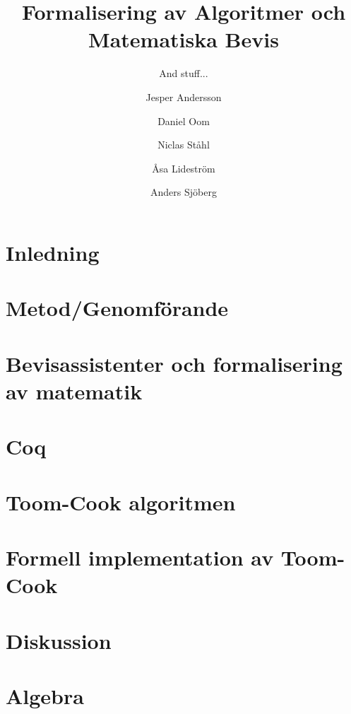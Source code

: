 \documentclass[bachelors,a4paper,gu]{chalmers-thesis}
\title{Formalisering av Algoritmer och Matematiska Bevis}
\subtitle{And stuff...}
\author{Jesper Andersson\and Daniel Oom\and Niclas Ståhl\and Åsa Lideström\and Anders Sjöberg}
\begin{document}
\maketitle

\chapter{Inledning}


\newpage
\chapter{Metod/Genomförande}


\newpage
\chapter{Bevisassistenter och formalisering av matematik}


\newpage
\chapter{Coq}




\newpage
\chapter{Toom-Cook algoritmen}






\newpage
\chapter{Formell implementation av Toom-Cook}



\newpage
\chapter{Diskussion}



\newpage
\nocite{*}
\printbibliography

\appendix
\newpage
\chapter{Algebra}

\end{document}
